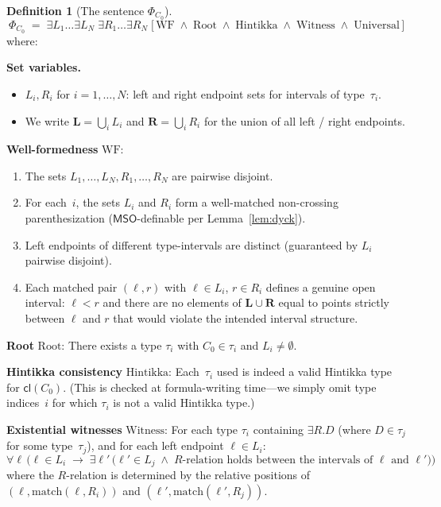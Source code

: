 \documentclass[a4paper,11pt]{article}
\theoremstyle{definition}
\newtheorem{definition}[theorem]{Definition}
\newcommand{\cl}{\ensuremath{\mathsf{cl}}}
\newcommand{\MSO}{\ensuremath{\mathsf{MSO}}}
\begin{document}
\begin{definition}[The sentence $\Phi_{C_0}$]
\label{def:sentence}
\[
  \Phi_{C_0} \;=\; \exists L_1 \ldots \exists L_N \;
  \exists R_1 \ldots \exists R_N \;
  \bigl[\,\mathrm{WF} \;\land\; \mathrm{Root} \;\land\;
  \mathrm{Hintikka} \;\land\; \mathrm{Witness} \;\land\;
  \mathrm{Universal}\,\bigr]
\]
where:

\smallskip\noindent
\textbf{Set variables.}\;
\begin{itemize}[nosep]
  \item $L_i, R_i$ for $i = 1, \ldots, N$: left and right endpoint
    sets for intervals of type~$\tau_i$.
  \item We write $\mathbf{L} = \bigcup_i L_i$ and $\mathbf{R} =
    \bigcup_i R_i$ for the union of all left / right endpoints.
\end{itemize}

\smallskip\noindent
\textbf{Well-formedness} $\mathrm{WF}$:
\begin{enumerate}[nosep,label=(W\arabic*)]
  \item The sets $L_1, \ldots, L_N, R_1, \ldots, R_N$ are pairwise
    disjoint.
  \item For each~$i$, the sets $L_i$ and $R_i$ form a well-matched
    non-crossing parenthesization
    \textup{(}$\MSO$-definable per Lemma~\ref{lem:dyck}\textup{)}.
  \item Left endpoints of different type-intervals are distinct
    \textup{(}guaranteed by $L_i$ pairwise disjoint\textup{)}.
  \item Each matched pair $(\ell, r)$ with $\ell \in L_i$, $r \in R_i$
    defines a genuine open interval: $\ell < r$ and there are no
    elements of $\mathbf{L} \cup \mathbf{R}$ equal to points strictly
    between $\ell$ and $r$ that would violate the intended interval
    structure.
\end{enumerate}

\smallskip\noindent
\textbf{Root} $\mathrm{Root}$:\;
There exists a type $\tau_i$ with $C_0 \in \tau_i$ and
$L_i \neq \emptyset$.

\smallskip\noindent
\textbf{Hintikka consistency} $\mathrm{Hintikka}$:\;
Each~$\tau_i$ used is indeed a valid Hintikka type for $\cl(C_0)$.
\textup{(}This is checked at formula-writing time---we simply omit
type indices~$i$ for which $\tau_i$ is not a valid Hintikka
type.\textup{)}

\smallskip\noindent
\textbf{Existential witnesses} $\mathrm{Witness}$:\;
For each type $\tau_i$ containing $\exists R.D$ (where $D \in
\tau_j$ for some type~$\tau_j$), and for each left endpoint
$\ell \in L_i$:
\[
  \forall \ell\,\bigl(\ell \in L_i \;\to\;
  \exists \ell'\,\bigl(\ell' \in L_j \;\land\;
  R\text{-relation holds between the intervals of } \ell \text{ and }
  \ell'\bigr)\bigr)
\]
where the $R$-relation is determined by the relative positions of
$(\ell, \mathrm{match}(\ell, R_i))$ and
$(\ell', \mathrm{match}(\ell', R_j))$.


\end{definition}
\end{document}
